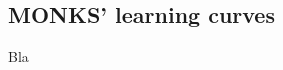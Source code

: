 \begin{appendices}
    \chapter{MONKS' learning curves} %
    \label{cha:monks_learning_curves}
        Bla
\end{appendices}
